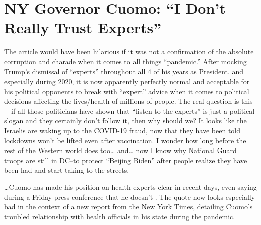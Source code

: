 \chapter{NY Governor Cuomo: \enquote{I Don't Really Trust Experts}}

\begin{refsection}

The article would have been hilarious if it was not a confirmation of the absolute corruption and charade when it comes to all things \enquote{pandemic.} After mocking Trump's dismissal of \enquote{experts} throughout all 4 of his years as President, and especially during 2020, it is now apparently perfectly normal and acceptable for his political opponents to break with \enquote{expert} advice when it comes to political decisions affecting the lives/health of millions of people. The real question is this---if all those politicians have shown that \enquote{listen to the experts} is just a political slogan and they certainly don't follow it, then why should we? It looks like the Israelis are waking up to the COVID-19 fraud, now that they have been told lockdowns won't be lifted even after vaccination. I wonder how long before the rest of the Western world does too\dots{} and\dots{} now I know why National Guard troops are still in DC--to protect \enquote{Beijing Biden} after people realize they have been had and start taking to the streets.

\begin{tcolorbox}[quote]

\dots{}Cuomo has made his position on health experts clear in recent days, even saying during a Friday press conference that he doesn't  .  The quote now looks especially bad in the context of a new report from the New York Times, detailing Cuomo's troubled relationship with health officials in his state during the pandemic.\textsuperscript{\cite{urlasd908yh}}

\end{tcolorbox}


\printbibliography[heading=subbibliography]

\end{refsection}